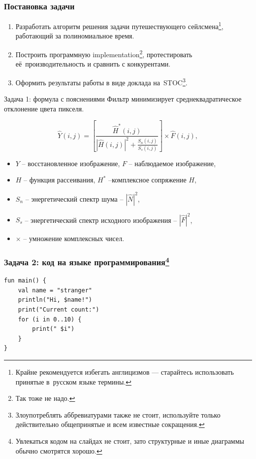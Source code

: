 \documentclass[14pt,aspectratio=169,hyperref={pdftex,unicode},xcolor=dvipsnames]{beamer}
\begin{document}
\begin{frame}
\frametitle{Постановка задачи}
\begin{enumerate}
\item Разработать алгоритм решения задачи путешествующего сейлсмена\footnote{Крайне рекомендуется избегать англицизмов --- старайтесь использовать принятые в~русском языке термины.}, работающий за полиномиальное время.
\item Построить программную implementation\footnote{Так тоже не надо.}, протестировать её~производительность и сравнить с конкурентами.
\item Оформить результаты работы в виде доклада на~STOC\footnote{Злоупотреблять аббревиатурами также не стоит, используйте только действительно общепринятые и всем известные сокращения.}.
\end{enumerate}
\end{frame}

\begin{frame}{Задача 1: формула с пояснениями}
\small
    Фильтр минимизирует среднеквадратическое отклонение цвета пикселя.
    
    \begin{equation*}\label{eq:wiener_nsr}
    \hat{Y}(i, j) = \left[ \frac{\hat{H}^*(i, j)}{\left|\hat{H}(i, j)\right|^2 + \frac{S_n(i, j)}{S_s(i, j)}} \right] \times \hat{F}(i, j),
    \end{equation*}
\begin{itemize}
    \item $Y$ -- восстановленное изображение,  $F$ -- наблюдаемое изображение,
    \item $H$ -- функция рассеивания, $H^*$ --комплексное сопряжение $H$,
    \item $S_n$ -- энергетический спектр шума -- $\left| \hat{N} \right|^2$,
    \item $S_s$ -- энергетический спектр исходного изображения -- $\left| \hat{F} \right|^2$,
    \item $\times$ -- умножение комплексных чисел.
\end{itemize}
\end{frame}


\begin{frame}[fragile]
\frametitle{Задача 2: код на языке программирования\footnote{Увлекаться кодом на слайдах не стоит, зато структурные и иные диаграммы обычно смотрятся хорошо.}}
\begin{verbatim}
fun main() {
    val name = "stranger"
    println("Hi, $name!")
    print("Current count:")
    for (i in 0..10) {
        print(" $i")
    }
}
\end{verbatim}
\end{frame}
\end{document}
